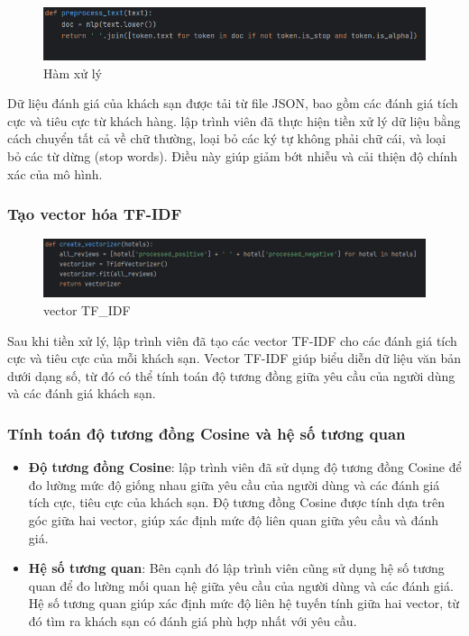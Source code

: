 \begin{figure}[H]
    \centering
    \includegraphics[width=0.9\linewidth]{Figures/pre_process.png}
    \caption{Hàm xử lý}
    \label{fig:enter-label}
\end{figure}
Dữ liệu đánh giá của khách sạn được tải từ file JSON, bao gồm các đánh giá tích cực và tiêu cực từ khách hàng. lập trình viên đã thực hiện tiền xử lý dữ liệu bằng cách chuyển tất cả về chữ thường, loại bỏ các ký tự không phải chữ cái, và loại bỏ các từ dừng (stop words). Điều này giúp giảm bớt nhiễu và cải thiện độ chính xác của mô hình.

\subsubsection{Tạo vector hóa TF-IDF}
\begin{figure}[H]
    \centering
    \includegraphics[width=0.9\linewidth]{Figures/TF-IDF.png}
    \caption{vector TF_IDF}
    \label{fig:enter-label}
\end{figure}
Sau khi tiền xử lý, lập trình viên đã tạo các vector TF-IDF cho các đánh giá tích cực và tiêu cực của mỗi khách sạn. Vector TF-IDF giúp biểu diễn dữ liệu văn bản dưới dạng số, từ đó có thể tính toán độ tương đồng giữa yêu cầu của người dùng và các đánh giá khách sạn.

\subsubsection{Tính toán độ tương đồng Cosine và hệ số tương quan}
\begin{itemize}
    \item \textbf{Độ tương đồng Cosine}: lập trình viên đã sử dụng độ tương đồng Cosine để đo lường mức độ giống nhau giữa yêu cầu của người dùng và các đánh giá tích cực, tiêu cực của khách sạn. Độ tương đồng Cosine được tính dựa trên góc giữa hai vector, giúp xác định mức độ liên quan giữa yêu cầu và đánh giá.
    \item \textbf{Hệ số tương quan}: Bên cạnh đó lập trình viên cũng sử dụng hệ số tương quan để đo lường mối quan hệ giữa yêu cầu của người dùng và các đánh giá. Hệ số tương quan giúp xác định mức độ liên hệ tuyến tính giữa hai vector, từ đó tìm ra khách sạn có đánh giá phù hợp nhất với yêu cầu.
\end{itemize}

